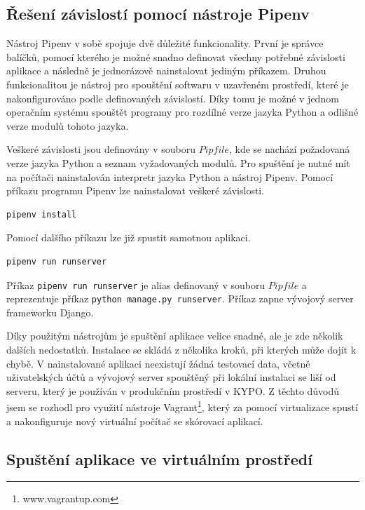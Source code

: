 \documentclass[
  digital, %
  twoside, %
  table,   %
  nolof,     %
  nolot,     %
]{fithesis3}
\begin{document}
\subsection{Řešení závislostí pomocí nástroje Pipenv}
Nástroj Pipenv v sobě spojuje dvě důležité funkcionality. První je správce balíčků, pomocí kterého je možné snadno definovat všechny potřebné závislosti aplikace a následně je jednorázově nainstalovat jediným příkazem. Druhou funkcionalitou je nástroj pro spouštění softwaru v uzavřeném prostředí, které je nakonfigurováno podle definovaných závislostí. Díky tomu je možné v jednom operačním systému spouštět programy pro rozdílné verze jazyka Python a odlišné verze modulů tohoto jazyka.

Veškeré závislosti jsou definovány v souboru $Pipfile$, kde se nachází požadovaná verze jazyka Python a seznam vyžadovaných modulů. Pro spuštění je nutné mít na počítači nainstalován interpretr jazyka Python a nástroj Pipenv. Pomocí příkazu programu Pipenv lze nainstalovat veškeré závislosti.

\begin{lstlisting}
pipenv install
\end{lstlisting}

Pomocí dalšího příkazu lze již spustit samotnou aplikaci.

\begin{lstlisting}
pipenv run runserver
\end{lstlisting}

Příkaz \lstinline[columns=fixed]{pipenv run runserver} je alias definovaný v souboru $Pipfile$ a reprezentuje příkaz \lstinline[columns=fixed]{python manage.py runserver}. Příkaz zapne vývojový server frameworku Django.

Díky použitým nástrojům je spuštění aplikace velice snadné, ale je zde několik dalších nedostatků. Instalace se skládá z několika kroků, při kterých může dojít k chybě. V nainstalované aplikaci neexistují žádná testovací data, včetně uživatelských účtů a vývojový server spouštěný při lokální instalaci se liší od serveru, který je používán v produkčním prostředí v KYPO. Z těchto důvodů jsem se rozhodl pro využití nástroje Vagrant\footnote{www.vagrantup.com}, který za pomocí virtualizace spustí a nakonfiguruje nový virtuální počítač se skórovací aplikací.

\subsection{Spuštění aplikace ve virtuálním prostředí}
\end{document}
